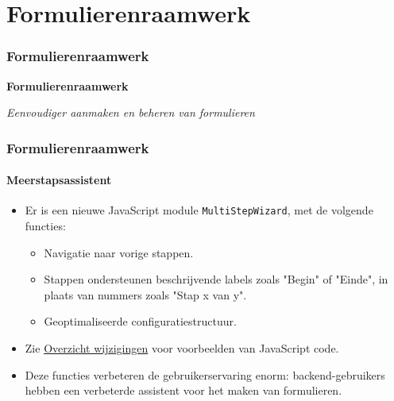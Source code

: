 %

\section{Formulierenraamwerk}
\begin{frame}[fragile]
	\frametitle{Formulierenraamwerk}

	\begin{center}\huge{\color{typo3darkgrey}\textbf{Formulierenraamwerk}}\end{center}
	\begin{center}\large{\textit{Eenvoudiger aanmaken en beheren van formulieren}}\end{center}

\end{frame}


\begin{frame}[fragile]
	\frametitle{Formulierenraamwerk}
	\framesubtitle{Meerstapsassistent}

	\begin{itemize}
		\item Er is een nieuwe JavaScript module \texttt{MultiStepWizard},
			met de volgende functies:

			\begin{itemize}
				\item Navigatie naar vorige stappen.
				\item Stappen ondersteunen beschrijvende labels zoals "Begin" of "Einde", in plaats van nummers zoals "Stap x van y".
				\item Geoptimaliseerde configuratiestructuur.
			\end{itemize}

		\item Zie \href{https://docs.typo3.org/c/typo3/cms-core/master/en-us/Changelog/10.2/Feature-79445-AddMultistepWizard.html}{Overzicht wijzigingen}
			voor voorbeelden van JavaScript code.

		\item Deze functies verbeteren de gebruikerservaring enorm: backend-gebruikers hebben een verbeterde assistent voor het maken van formulieren.

	\end{itemize}

\end{frame}

